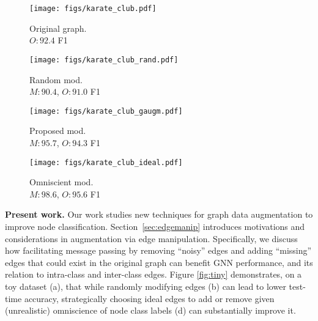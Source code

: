 \documentclass[letterpaper]{article} \usepackage{aaai21}  \usepackage{times}  \usepackage{helvet} \usepackage{courier}  \usepackage[hyphens]{url}  \usepackage{graphicx} \urlstyle{rm} \def\UrlFont{\rm}  \usepackage{natbib}  \usepackage{caption} \frenchspacing  \setlength{\pdfpagewidth}{8.5in}  \setlength{\pdfpageheight}{11in}
\begin{document}
\begin{figure*}[t]
    \centering
        \begin{subfigure}[b]{.2\linewidth}
         \texttt{[image: figs/karate\_club.pdf]}  
         \caption{Original graph. \\ $O: 92.4$ F1}\label{fig:tiny_orig}
        \end{subfigure}\quad
        \begin{subfigure}[b]{.2\linewidth}
         \texttt{[image: figs/karate\_club\_rand.pdf]}
            \caption{Random mod.\\ $M: 90.4$, $O: 91.0$ F1}\label{fig:tiny_rand}
        \end{subfigure}\quad
        \begin{subfigure}[b]{.2\linewidth}
         \texttt{[image: figs/karate\_club\_gaugm.pdf]}
            \caption{Proposed \methodshared mod.\\ $M: 95.7$, $O: 94.3$ F1}\label{fig:tiny_gaugm}
        \end{subfigure}\quad
        \begin{subfigure}[b]{.2\linewidth}
         \texttt{[image: figs/karate\_club\_ideal.pdf]}
            \caption{Omniscient mod.\\ $M: 98.6$, $O: 95.6$ F1}\label{fig:tiny_ideal}
        \end{subfigure}
        \caption{\label{fig:tiny} \gcn performance (test micro-F1) on the original Zachary's Karate Club graph in (a), and three augmented graph variants in (b-d), evaluated on both original ($O$) and modified ($M$) graph settings. Black, solid-blue, dashed-blue edges denote original graph connectivity, newly added, and removed edges respectively.  While random graph modification (b) hurts performance, our proposed \methodshared augmentation approaches (c) demonstrate significant relative performance improvements, narrowing the gap to omniscient, class-aware modifications (d).}
\end{figure*}

\noindent \textbf{Present work.} Our work studies new techniques for graph data augmentation to improve node classification.  Section~\ref{sec:edgemanip} introduces motivations and considerations in augmentation via edge manipulation.  Specifically, we discuss how facilitating message passing by removing ``noisy'' edges and adding ``missing'' edges that could exist in the original graph can benefit GNN performance, and its relation to intra-class and inter-class edges.  Figure \ref{fig:tiny} demonstrates, on a toy dataset (a), that while randomly modifying edges (b) can lead to lower test-time accuracy,  strategically choosing ideal edges to add or remove given (unrealistic) omniscience of node class labels (d) can substantially improve it.
\end{document}
